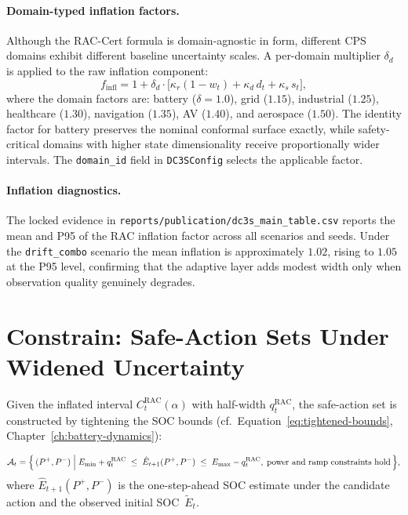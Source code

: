 \paragraph{Domain-typed inflation factors.}
Although the RAC-Cert formula is domain-agnostic in form, different CPS
domains exhibit different baseline uncertainty scales.  A per-domain
multiplier $\delta_d$ is applied to the raw inflation component:
\[
  f_{\mathrm{infl}} = 1 + \delta_d \cdot \bigl[
    \kappa_r(1-w_t) + \kappa_d\,d_t + \kappa_s\,s_t \bigr],
\]
where the domain factors are: battery ($\delta = 1.0$),
grid ($1.15$), industrial ($1.25$), healthcare ($1.30$),
navigation ($1.35$), AV ($1.40$), and aerospace ($1.50$).
The identity factor for battery preserves the nominal conformal surface
exactly, while safety-critical domains with higher state dimensionality
receive proportionally wider intervals.
The \texttt{domain\_id} field in \texttt{DC3SConfig} selects the
applicable factor.

\paragraph{Inflation diagnostics.}
The locked evidence in \texttt{reports/publication/dc3s\_main\_table.csv}
reports the mean and P95 of the RAC inflation factor across all scenarios
and seeds.  Under the \texttt{drift\_combo} scenario the mean inflation
is approximately $1.02$, rising to $1.05$ at the P95 level, confirming that
the adaptive layer adds modest width only when observation quality genuinely
degrades.

\section{Constrain: Safe-Action Sets Under Widened Uncertainty}
\label{sec:constrain}

Given the inflated interval $C_t^{\mathrm{RAC}}(\alpha)$ with half-width
$q_t^{\mathrm{RAC}}$, the safe-action set is constructed by tightening
the SOC bounds (cf.\ Equation~\eqref{eq:tightened-bounds},
Chapter~\ref{ch:battery-dynamics}):

\begin{equation}
\label{eq:safe-action-set}
  \mathcal{A}_t = \Bigl\{\,(P^{+}, P^{-}) \;\Big|\;
    E_{\min} + q_t^{\mathrm{RAC}} \;\le\; \hat{E}_{t+1}(P^{+}, P^{-})
    \;\le\; E_{\max} - q_t^{\mathrm{RAC}},\;
    \text{power and ramp constraints hold}\,\Bigr\},
\end{equation}
where $\hat{E}_{t+1}(P^{+}, P^{-})$ is the one-step-ahead SOC estimate
under the candidate action and the observed initial SOC~$\tilde{E}_t$.

